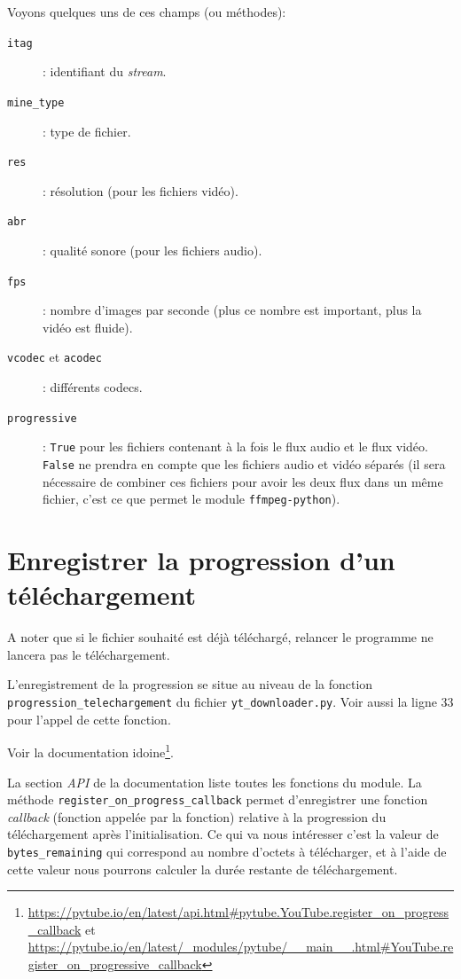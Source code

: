 \documentclass[a4paper,11pt]{book}
\begin{document}
Voyons quelques uns de ces champs (ou méthodes):
\begin{description}
	\item[\texttt{itag}]: identifiant du \textit{stream}.
	\item[\texttt{mine\_type}]: type de fichier.
	\item[\texttt{res}]: résolution (pour les fichiers vidéo).
	\item[\texttt{abr}]: qualité sonore (pour les fichiers audio).
	\item[\texttt{fps}]: nombre d'images par seconde (plus ce nombre est important, plus la vidéo est fluide).
	\item[\texttt{vcodec} et \texttt{acodec}]: différents codecs.
	\item[\texttt{progressive}]: \texttt{True} pour les fichiers contenant à la fois le flux audio et le flux vidéo. \texttt{False} ne prendra en compte que les fichiers audio et vidéo séparés (il sera nécessaire de combiner ces fichiers pour avoir les deux flux dans un même fichier, c'est ce que permet le module \texttt{ffmpeg-python}).
\end{description}
\medskip

\section{Enregistrer la progression d'un téléchargement}
A noter que si le fichier souhaité est déjà téléchargé, relancer le programme ne lancera pas le téléchargement.
\medskip

L'enregistrement de la progression se situe au niveau de la fonction \\ \texttt{progression\_telechargement} du fichier \texttt{yt\_downloader.py}. Voir aussi la ligne 33 pour l'appel de cette fonction.
\medskip

Voir la documentation idoine\footnote{\url{https://pytube.io/en/latest/api.html\#pytube.YouTube.register\_on\_progress\_callback} et \url{https://pytube.io/en/latest/\_modules/pytube/\_\_main\_\_.html\#YouTube.register\_on\_progressive\_callback}}.
\medskip

La section \textit{API} de la documentation liste toutes les fonctions du module. La méthode \texttt{register\_on\_progress\_callback} permet d'enregistrer une fonction \textit{callback} (fonction appelée par la fonction) relative à la progression du téléchargement après l'initialisation. Ce qui va nous intéresser c'est la valeur de \texttt{bytes\_remaining} qui correspond au nombre d'octets à télécharger, et à l'aide de cette valeur nous pourrons calculer la durée restante de téléchargement.
\medskip
\end{document}
